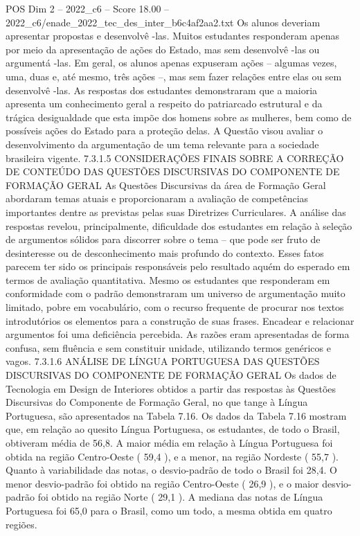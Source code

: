 \begin{textsample}{POS Dim 2 – 2022\_c6 – Score 18.00 – 2022\_c6/enade\_2022\_tec\_des\_inter\_b6c4af2aa2.txt}
Os alunos deveriam apresentar propostas e desenvolvê -las.
Muitos estudantes responderam apenas por meio da apresentação de ações do Estado, mas sem desenvolvê -las ou argumentá -las.
Em geral, os alunos apenas expuseram ações – algumas vezes, uma, duas e, até mesmo, três ações –, mas sem fazer relações entre elas ou sem desenvolvê -las.
As respostas dos estudantes demonstraram que a maioria apresenta um conhecimento geral a respeito do patriarcado estrutural e da trágica desigualdade que esta impõe dos homens sobre as mulheres, bem como de possíveis ações do Estado para a proteção delas.
A Questão visou avaliar o desenvolvimento da argumentação de um tema relevante para a sociedade brasileira vigente. 7.3.1.5 CONSIDERAÇÕES FINAIS SOBRE A CORREÇÃO DE CONTEÚDO DAS QUESTÕES DISCURSIVAS DO COMPONENTE DE FORMAÇÃO GERAL As Questões Discursivas da área de Formação Geral abordaram temas atuais e proporcionaram a avaliação de competências importantes dentre as previstas pelas suas Diretrizes Curriculares.
A análise das respostas revelou, principalmente, dificuldade dos estudantes em relação à seleção de argumentos sólidos para discorrer sobre o tema – que pode ser fruto de desinteresse ou de desconhecimento mais profundo do contexto.
Esses fatos parecem ter sido os principais responsáveis pelo resultado aquém do esperado em termos de avaliação quantitativa.
Mesmo os estudantes que responderam em conformidade com o padrão demonstraram um universo de argumentação muito limitado, pobre em vocabulário, com o recurso frequente de procurar nos textos introdutórios os elementos para a construção de suas frases.
Encadear e relacionar argumentos foi uma deficiência percebida.
As razões eram apresentadas de forma confusa, sem fluência e sem constituir unidade, utilizando termos genéricos e vagos. 7.3.1.6 ANÁLISE DE LÍNGUA PORTUGUESA DAS QUESTÕES DISCURSIVAS DO COMPONENTE DE FORMAÇÃO GERAL Os dados de Tecnologia em Design de Interiores obtidos a partir das respostas às Questões Discursivas do Componente de Formação Geral, no que tange à Língua Portuguesa, são apresentados na Tabela 7.16.
Os dados da Tabela 7.16 mostram que, em relação ao quesito Língua Portuguesa, os estudantes, de todo o Brasil, obtiveram média de 56,8.
A maior média em relação à Língua Portuguesa foi obtida na região Centro-Oeste ( 59,4 ), e a menor, na região Nordeste ( 55,7 ).
Quanto à variabilidade das notas, o desvio-padrão de todo o Brasil foi 28,4.
O menor desvio-padrão foi obtido na região Centro-Oeste ( 26,9 ), e o maior desvio-padrão foi obtido na região Norte ( 29,1 ).
A mediana das notas de Língua Portuguesa foi 65,0 para o Brasil, como um todo, a mesma obtida em quatro regiões.

\end{textsample}

